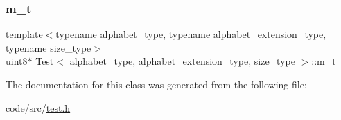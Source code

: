 \mbox{\label{class_test_ad5db148e90886fc6524a1f07194df9a9}} 
\subsubsection{\texorpdfstring{m\+\_\+t}{m\_t}}
{\footnotesize\ttfamily template$<$typename alphabet\+\_\+type, typename alphabet\+\_\+extension\+\_\+type, typename size\+\_\+type$>$ \\
\hyperlink{types_8h_a115946cb5fc5879545e9ccea096a6031}{uint8}$\ast$ \hyperlink{class_test}{Test}$<$ alphabet\+\_\+type, alphabet\+\_\+extension\+\_\+type, size\+\_\+type $>$\+::m\+\_\+t\hspace{0.3cm}{\ttfamily [private]}}



The documentation for this class was generated from the following file\+:\begin{DoxyCompactItemize}
\item 
code/src/\hyperlink{test_8h}{test.\+h}\end{DoxyCompactItemize}
